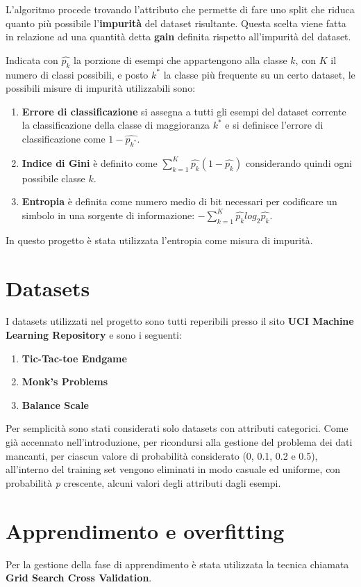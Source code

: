 \documentclass[a4paper, 10pt]{article}
\begin{document}
L'algoritmo procede trovando l'attributo che permette di fare uno split che riduca quanto più possibile l'\textbf{impurità} del dataset risultante. Questa scelta viene fatta in relazione ad una quantità detta \textbf{gain} definita rispetto all'impurità del dataset.

Indicata con $\hat{p_{k}}$ la porzione di esempi che appartengono alla classe $k$, con $K$ il numero di classi possibili, e posto $k^{*}$ la classe più frequente su un certo dataset, le possibili misure di impurità utilizzabili sono:
\begin{enumerate}
\item\textbf{Errore di classificazione}  si assegna a tutti gli esempi del dataset corrente la classificazione della classe di maggioranza $k^{*}$ e si definisce l'errore di classificazione come $1 - \hat{p_{k^*}}$.
\item\textbf{Indice di Gini} è definito come $\sum_{k=1}^{K}\hat{p_{k}}(1 - \hat{p_{k}})$ considerando quindi ogni possibile classe $k$.
\item\textbf{Entropia} è definita come numero medio di bit necessari per codificare un simbolo in una sorgente di informazione: $-\sum_{k=1}^{K}\hat{p_{k}}log_2{\hat{p_{k}}}$.
\end{enumerate}
In questo progetto è stata utilizzata l'entropia come misura di impurità.
\section{Datasets}
I datasets utilizzati nel progetto sono tutti reperibili presso il sito \textbf{UCI Machine Learning Repository} e sono i seguenti:
\begin{enumerate}
\item\textbf{Tic-Tac-toe Endgame}
\item\textbf{Monk's Problems}
\item\textbf{Balance Scale}
\end{enumerate}
Per semplicità sono stati considerati solo datasets con attributi categorici. Come già accennato nell'introduzione, per ricondursi alla gestione del problema dei dati mancanti, per ciascun valore di probabilità considerato (0, 0.1, 0.2 e 0.5), all'interno del training set vengono eliminati in modo casuale ed uniforme, con probabilità \textit{p} crescente, alcuni valori degli attributi dagli esempi.
\section{Apprendimento e overfitting}
Per la gestione della fase di apprendimento è stata utilizzata la tecnica chiamata \textbf{Grid Search Cross Validation}.
\end{document}

